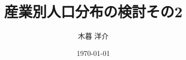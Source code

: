 \documentclass[12pt,a4paper]{ltjsarticle}
\title{\bfseries 産業別人口分布の検討その2}
\author{木暮 洋介}
\date{\today}
\begin{document}
\maketitle
\onehalfspacing



\cite{akamatsu2017discrete}

\cite{sugimoto2022chiiki}

\clearpage


\end{document}
